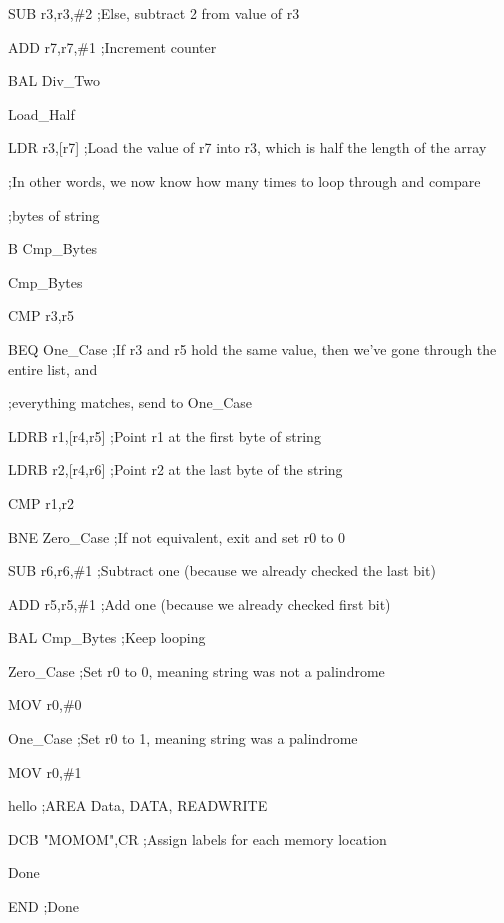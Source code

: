 \documentclass[letterpaper,10pt,titlepage]{article}
\begin{document}
\begin{enumerate}
		SUB		r3,r3,\#2		;Else, subtract 2 from value of r3

		ADD		r7,r7,\#1		;Increment counter

		BAL		Div\_Two





Load\_Half	

		LDR		r3,[r7]	        ;Load the value of r7 into r3, which is half the length of the array

							;In other words, we now know how many times to loop through and compare

							;bytes of string

		B		Cmp\_Bytes

		



Cmp\_Bytes

		CMP		r3,r5

		BEQ		One\_Case	        ;If r3 and r5 hold the same value, then we've gone through the entire list, and

							;everything matches, send to One\_Case

		LDRB	        r1,[r4,r5]	        ;Point r1 at the first byte of string

		LDRB	        r2,[r4,r6]	        ;Point r2 at the last byte of the string

		CMP		r1,r2

		BNE		Zero\_Case	;If not equivalent, exit and set r0 to 0

		SUB		r6,r6,\#1		;Subtract one (because we already checked the last bit)

		ADD		r5,r5,\#1		;Add one (because we already checked first bit)

		BAL		Cmp\_Bytes	;Keep looping

		



Zero\_Case	;Set r0 to 0, meaning string was not a palindrome

		MOV r0,\#0

	

One\_Case	        ;Set r0 to 1, meaning string was a palindrome

		MOV r0,\#1





hello		;AREA Data, DATA, READWRITE

		DCB "MOMOM",CR				;Assign labels for each memory location



Done

		END					;Done



\end{enumerate}
\end{document}
